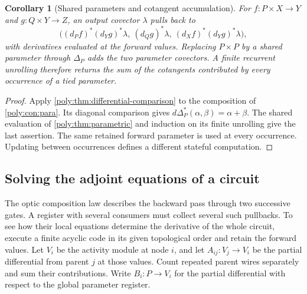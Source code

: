 \documentclass[11pt,a4paper]{article}
\newtheorem{corollary}[corollary]{Corollary}
\theoremstyle{definition}
\theoremstyle{remark}\newaliascnt{remark}{theorem}
\numberwithin{equation}{section}
\begin{document}
\begin{corollary}[Shared parameters and cotangent accumulation]\label{neural:cor:sharing}
For $f:P\times X\to Y$ and $g:Q\times Y\to Z$, an output covector $\lambda$ pulls back to
\[
 \bigl((d_Pf)^*(d_Yg)^*\lambda,\ (d_Qg)^*\lambda,\
       (d_Xf)^*(d_Yg)^*\lambda\bigr),
\]
with derivatives evaluated at the forward values. Replacing $P\times P$ by a shared parameter through $\Delta_P$ adds the two parameter covectors. A finite recurrent unrolling therefore returns the sum of the cotangents contributed by every occurrence of a tied parameter.
\end{corollary}
\begin{proof}
Apply \cref{poly:thm:differential-comparison} to the
composition of \cref{poly:con:para}. Its diagonal comparison gives
$d\Delta_P^*(\alpha,\beta)=\alpha+\beta$. The shared evaluation
of \cref{poly:thm:parametric} and induction on its finite unrolling
give the last assertion. The same retained forward parameter is used
at every occurrence. Updating between occurrences defines a different
stateful computation.
\end{proof}

\subsection{Solving the adjoint equations of a circuit}

The optic composition law describes the backward pass through two successive gates. A register with several consumers must collect several such pullbacks. To see how their local equations determine the derivative of the whole circuit, execute a finite acyclic code in its given topological order and retain the forward values. Let $V_i$ be the activity module at node $i$, and let $A_{ij}:V_j\to V_i$ be the partial differential from parent $j$ at those values. Count repeated parent wires separately and sum their contributions. Write $B_i:P\to V_i$ for the partial differential with respect to the global parameter register.
\end{document}
